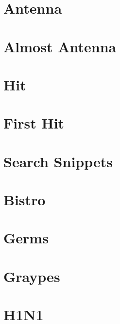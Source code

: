 \documentclass[a4paper, 10pt]{article}
\let\stdsection\section
\renewcommand\section{\newpage\stdsection}
\newcommand{\includecode}[1]{
    }
\begin{document}

    \section{Antenna}
        \includecode{../problems/w06/Antenna/Antenna1.cpp}
        
    \section{Almost Antenna}
        \includecode{../problems/w06/AlmostAntenna/AlmostAntenna1.cpp}
        
    \section{Hit}
        \includecode{../problems/w06/Hit/Hit1.cpp}
        
    \section{First Hit}
        \includecode{../problems/w06/FirstHit/FirstHit1.cpp}
    
    \section{Search Snippets}
        \includecode{../problems/w06/Search_Snippets/SearchSnippets1.cpp}
              
    
    \section{Bistro}
        \includecode{../problems/w07/Bistro/Bistro1.cpp}
        
    \section{Germs}
        \includecode{../problems/w07/Germs/Germs1.cpp}
        
    \section{Graypes}
        \includecode{../problems/w07/Graypes/Graypes1.cpp}
        
    \section{H1N1}
        \includecode{../problems/w07/H1N1/H1N1_1.cpp}
    
\end{document}
